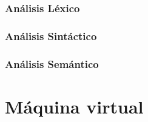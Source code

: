 \subsubsection{Análisis Léxico}


\subsubsection{Análisis Sintáctico}


\subsubsection{Análisis Semántico}


\section{Máquina virtual}

